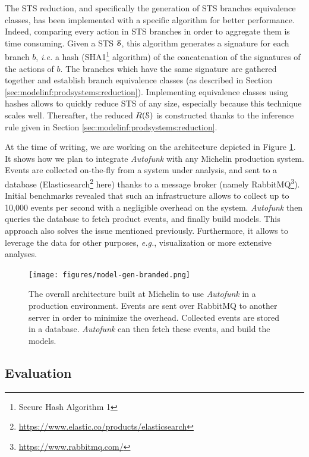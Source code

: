 The STS reduction, and specifically the generation
of STS branches equivalence classes, has been implemented with a
specific algorithm for better performance. Indeed, comparing
every action in STS branches in order to aggregate them is time
consuming.  Given a STS $\EuScript{S}$, this algorithm generates
a signature for each branch $b$, \emph{i.e.} a hash
(SHA1\footnote{Secure Hash Algorithm 1} algorithm) of
the concatenation of the signatures of the actions of $b$. The
branches which have the same signature are gathered together and
establish branch equivalence classes (as described in Section
\ref{sec:modelinf:prodsystems:reduction}). Implementing
equivalence classes using hashes allows to quickly reduce STS of
any size, especially because this technique scales well.
Thereafter, the reduced $R(\EuScript{S})$ is constructed thanks
to the inference rule given in Section
\ref{sec:modelinf:prodsystems:reduction}.

At the time of writing, we are working on the architecture
depicted in Figure \ref{fig:autofunk_gen_branded}. It shows how
we plan to integrate \textit{Autofunk} with any Michelin
production system.  Events are collected on-the-fly from a system
under analysis, and sent to a database
(Elasticsearch\footnote{\url{https://www.elastic.co/products/elasticsearch}}
here) thanks to a message broker (namely
RabbitMQ\footnote{\url{https://www.rabbitmq.com/}}). Initial
benchmarks revealed that such an infrastructure allows to collect
up to 10,000 events per second with a negligible overhead on the
system. \textit{Autofunk} then queries the database to fetch
product events, and finally build models. This approach also
solves the issue mentioned previously. Furthermore, it allows to
leverage the data for other purposes, \emph{e.g.}, visualization or more
extensive analyses.

\begin{figure}[ht]
    \texttt{[image: figures/model-gen-branded.png]}

    \caption{The overall architecture built at Michelin to use
    \textit{Autofunk} in a production environment. Events are
    sent over RabbitMQ to another server in order to minimize
    the overhead. Collected events are stored in a database.
    \textit{Autofunk} can then fetch these events, and build
    the models.}
    \label{fig:autofunk_gen_branded}
\end{figure}

\subsection{Evaluation}

